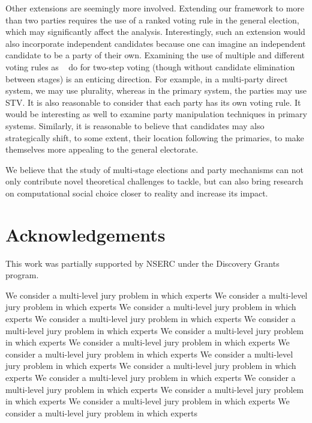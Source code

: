 \documentclass[letterpaper]{article} %
\newcommand{\citet}[1]{\citeauthor{#1}~\shortcite{#1}}
\theoremstyle{definition}
\begin{document}
Other extensions are seemingly more involved. Extending our framework to more than two parties requires the use of a ranked voting rule in the general election, which may significantly affect the analysis. Interestingly, such an extension would also incorporate independent candidates because one can imagine an independent candidate to be a party of their own. Examining the use of multiple and different voting rules as \citet{NW13} do for two-step voting (though without candidate elimination between stages) is an enticing direction. For example, in a multi-party direct system, we may use plurality, whereas in the primary system, the parties may use STV. It is also reasonable to consider that each party has its own voting rule. It would be interesting as well to examine party manipulation techniques in primary systems. Similarly, it is reasonable to believe that candidates may also strategically shift, to some extent, their location following the primaries, to make themselves more appealing to the general electorate.

We believe that the study of multi-stage elections and party mechanisms can not only contribute novel theoretical challenges to tackle, but can also bring research on computational social choice closer to reality and increase its impact.

\section{Acknowledgements}
This work was partially supported by NSERC under the Discovery Grants program.
\small

We consider a multi-level jury problem in which experts
We consider a multi-level jury problem in which experts
We consider a multi-level jury problem in which experts
We consider a multi-level jury problem in which experts
We consider a multi-level jury problem in which experts
We consider a multi-level jury problem in which experts
We consider a multi-level jury problem in which experts
We consider a multi-level jury problem in which experts
We consider a multi-level jury problem in which experts
We consider a multi-level jury problem in which experts
We consider a multi-level jury problem in which experts
We consider a multi-level jury problem in which experts
We consider a multi-level jury problem in which experts
We consider a multi-level jury problem in which experts
We consider a multi-level jury problem in which experts
\clearpage

\end{document}
